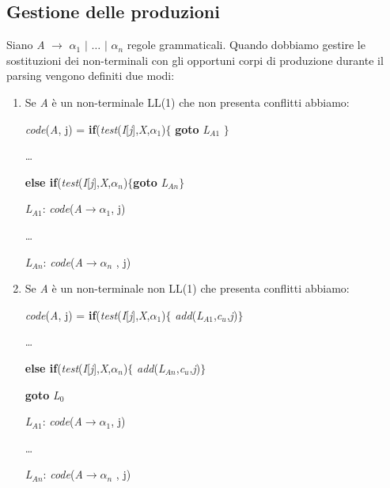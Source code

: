\subsection{Gestione delle produzioni}
Siano \textit{A} $\to$ $\alpha_1$ $\mid$ $\dots$ $\mid$ $\alpha_{n}$ regole grammaticali. Quando dobbiamo gestire le sostituzioni dei non-terminali con gli opportuni corpi di produzione durante il parsing vengono definiti due modi:
\begin{enumerate}
	\item Se \textit{A} è un non-terminale LL(1) che non presenta conflitti abbiamo:\par
	\hspace{2.5cm}\textit{code}(\textit{A}, j) = \hspace{2cm}\textbf{if}(\textit{test}(\textit{I}[\textit{j}],\textit{X},$\alpha_1$)$\{$ \textbf{goto} \textit{L}$_{A1}$ $\}$ \par 
	\hspace{6.8cm} \dots \par
	\hspace{6.8cm} \textbf{else if}(\textit{test}(\textit{I}[\textit{j}],\textit{X},$\alpha_n$)$\{$\textbf{goto} \textit{L}$_{An}$$\}$ \par 
	\hspace{6.2cm} \textit{L}$_{A1}$: \textit{code}(\textit{A}$\to$$\alpha_1$, j) \par 
	\hspace{6.2cm} \dots \par 
	\hspace{6.2cm} \textit{L}$_{An}$: \textit{code}(\textit{A}$\to$$\alpha_{n}$ , j) \par 
	\item Se \textit{A} è un non-terminale non LL(1) che presenta conflitti abbiamo:\par
	\hspace{2.5cm}\textit{code}(\textit{A}, j) = \hspace{2cm}\textbf{if}(\textit{test}(\textit{I}[\textit{j}],\textit{X},$\alpha_1$)$\{$ \textit{add}(\textit{L}$_{A1}$,\textit{c}$_u$,\textit{j})$\}$ \par 
	\hspace{6.8cm} \dots \par
	\hspace{6.8cm} \textbf{else if}(\textit{test}(\textit{I}[\textit{j}],\textit{X},$\alpha_n$)$\{$ \textit{add}(\textit{L}$_{An}$,\textit{c}$_u$,\textit{j})$\}$ \par 
	\hspace{6.8cm}\textbf{goto} \textit{L}$_0$ \par 
	\hspace{6.2cm} \textit{L}$_{A1}$: \textit{code}(\textit{A}$\to$$\alpha_1$, j) \par 
	\hspace{6.2cm} \dots \par 
	\hspace{6.2cm} \textit{L}$_{An}$: \textit{code}(\textit{A}$\to$$\alpha_{n}$ , j) \par 
\end{enumerate}
